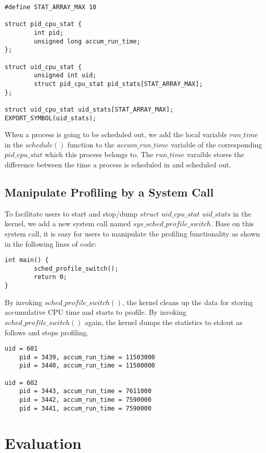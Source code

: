 \documentclass[11pt]{article}
\begin{document}
\begin{lstlisting}[style=CStyle]
#define STAT_ARRAY_MAX 10

struct pid_cpu_stat {
        int pid;
        unsigned long accum_run_time;
};
   
struct uid_cpu_stat {
        unsigned int uid;
        struct pid_cpu_stat pid_stats[STAT_ARRAY_MAX];
};

struct uid_cpu_stat uid_stats[STAT_ARRAY_MAX];
EXPORT_SYMBOL(uid_stats);
\end{lstlisting}

When a process is going to be scheduled out, we add the local variable $run\_time$ in the $schedule()$ function to the $accum\_run\_time$ variable of the corresponding $pid\_cpu\_stat$ which this process belongs to. The $run\_time$ varaible  stores the difference between the time a process is scheduled in and scheduled out. 

\subsection{Manipulate Profiling by a System Call}

To facilitate users to start and stop/dump $struct$ $uid\_cpu\_stat$ $uid\_stats$ in the kernel, we add a new system call named $sys\_sched\_profile\_switch$. Base on this system call, it is easy for users to manipulate the profiling functionality as shown in the following lines of code:

\begin{lstlisting}[style=CStyle]
int main() {
        sched_profile_switch(); 
        return 0;
}
\end{lstlisting}

By invoking $sched\_profile\_switch()$, the kernel cleans up the data for storing accumulative CPU time and starts to profile. By invoking $sched\_profile\_switch()$ again, the kernel dumps the statistics to stdout as follows and stops profiling.

\begin{lstlisting}[style=CStyle]
uid = 601
    pid = 3439, accum_run_time = 11503000
    pid = 3440, accum_run_time = 11500000

uid = 602
    pid = 3443, accum_run_time = 7611000
    pid = 3442, accum_run_time = 7590000
    pid = 3441, accum_run_time = 7590000
\end{lstlisting}

\section{Evaluation}
\end{document}
